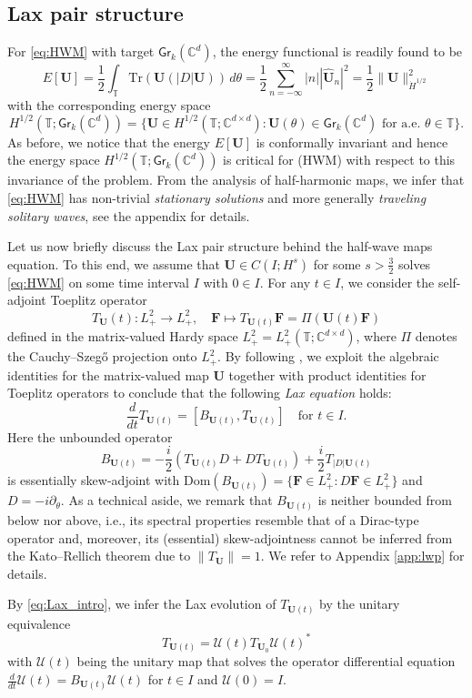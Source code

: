 \documentclass[10pt,reqno,a4paper]{amsart}
\theoremstyle{definition}
\theoremstyle{remark}
\theoremstyle{remark}
\numberwithin{equation}{section}
\newcommand{\C}{\mathbb{C}}
\newcommand{\T}{\mathbb{T}}
\newcommand{\dom}{\mathrm{Dom}}
\newcommand{\pt}{\partial}
\newcommand{\be}{\begin{equation}}
\newcommand{\ee}{\end{equation}}
\newcommand{\Ub}{\mathbf{U}}
\newcommand{\Fb}{\mathbf{F}}
\newcommand{\id}{I}
\newcommand{\Tr}{\mathrm{Tr}}
\newcommand{\Gr}{\mathsf{Gr}}
\newcommand{\Us}{\mathscr{U}}
\begin{document}
\subsection{Lax pair structure}
For \eqref{eq:HWM} with target $\Gr_k(\C^d)$, the energy functional is readily found to be
\be \label{def:energy_HWM}
E[\Ub] = \frac{1}{2} \int_\T \Tr(\Ub (|D|\Ub)) \, d\theta = \frac{1}{2} \sum_{n =-\infty}^\infty |n| |\widehat{\Ub}_n|^2 = \frac{1}{2} \| \Ub \|_{\dot{H}^{1/2}}^2
\ee
with  the corresponding energy space
$$
H^{1/2}(\T; \Gr_k(\C^d)) = \{ \Ub \in H^{1/2}(\T; \C^{d \times d}) : \mbox{$\Ub(\theta) \in \Gr_k(\C^d)$ for a.e.~$\theta \in \T$} \}.
$$
As before, we notice that the energy $E[\Ub]$ is conformally invariant and hence the energy space $H^{1/2}(\T; \Gr_k(\C^d))$ is critical for (HWM) with respect to this invariance of the problem. From the analysis of half-harmonic maps, we infer that \eqref{eq:HWM} has non-trivial {\em stationary solutions} and more generally {\em traveling solitary waves}, see the appendix for details.

Let us now briefly discuss the Lax pair structure behind the half-wave maps equation. To this end, we assume that $\Ub \in C(I; H^s)$ for some $s > \frac 3 2$ solves \eqref{eq:HWM} on some time interval $I$ with $0 \in I$. For any $t \in I$, we consider the self-adjoint Toeplitz operator
\be \label{def:Toep}
T_\Ub(t) : L^2_+ \to L^2_+, \quad \Fb \mapsto T_{\Ub(t)} \Fb = \Pi (\Ub(t) \Fb) 
\ee
defined in the matrix-valued Hardy space $L^2_+=L^2_+(\T; \C^{d \times d})$, where $\Pi$ denotes the Cauchy--Szeg\H{o} projection onto $L^2_+$. By following \cite{GeLe-18, GeLe-25}, we exploit the algebraic identities for the matrix-valued map $\Ub$ together with product identities for Toeplitz operators to conclude that the following {\em Lax equation} holds:
\be \label{eq:Lax_intro}
\frac{d}{dt} T_{\Ub(t)} = [B_{\Ub(t)}, T_{\Ub(t)}] \quad \mbox{for $t \in I$}.
\ee
Here the unbounded operator 
$$
B_{\Ub(t)} = -\frac{i}{2} ( T_{\Ub(t)} D + D  T_{\Ub(t)}) + \frac{i}{2} T_{|D| \Ub(t)}
$$
is essentially skew-adjoint with $\dom(B_{\Ub(t)}) = \{ \Fb \in L^2_+ : D \Fb \in L^2_+ \}$ and $D = -i \pt_\theta$. As a technical aside, we remark that $B_{\Ub(t)}$ is neither bounded from below nor above, i.e., its spectral properties resemble that of a Dirac-type operator and, moreover, its (essential) skew-adjointness cannot be inferred from the Kato--Rellich theorem due to $\| T_\Ub \| = 1$. We refer to Appendix \ref{app:lwp} for details.

By \eqref{eq:Lax_intro}, we infer the Lax evolution of $T_{\Ub(t)}$ by the unitary equivalence
\be \label{eq:T_unitary}
T_{\Ub(t)} = \Us(t) T_{\Ub_0} \Us(t)^*
\ee
with $\Us(t)$ being the unitary map that solves the operator differential equation $\frac{d}{dt} \Us(t) = B_{\Ub(t)} \Us(t)$ for $t \in I$ and $\Us(0) = \id$. 
\end{document}
